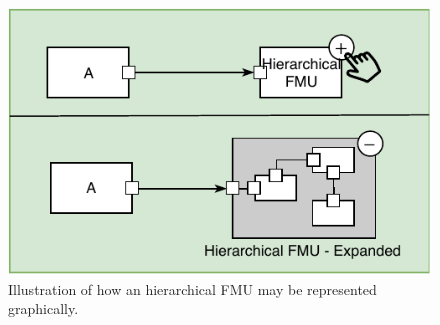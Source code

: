 \begin{figure}[bt]
\centering
\includegraphics[width=0.8\columnwidth]{Images/hierarchical_fmu.pdf}
\caption{Illustration of how an hierarchical FMU may be represented graphically.}
\label{fig:hierarchical_fmu}
\end{figure}
